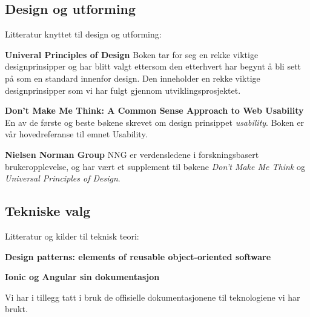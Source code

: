 \subsection{\textbf{Design og utforming}}
Litteratur knyttet til design og utforming:

\begin{description}

    \item \textbf{Univeral Principles of Design}
    Boken tar for seg en rekke viktige designprinsipper og har blitt valgt ettersom den etterhvert har begynt å bli sett på som en standard innenfor design. Den inneholder en rekke viktige designprinsipper som vi har fulgt gjennom utviklingsprosjektet.

    \item \textbf{Don't Make Me Think: A Common Sense Approach to Web Usability}
    En av de første og beste bøkene skrevet om design prinsippet \textit{usability}. Boken er vår hovedreferanse til emnet Usability. 
    
    \item \textbf{Nielsen Norman Group}
    NNG er verdensledene i forskningsbasert brukeropplevelse, og har vært et supplement til bøkene \textit{Don't Make Me Think} og \textit{Universal Principles of Design}.
  

\end{description}





\subsection{\textbf{Tekniske valg}}
Litteratur og kilder til teknisk teori:

\begin{description}
    \item \textbf{Design patterns: elements of reusable object-oriented software}
    
    \item \textbf{Ionic og Angular sin dokumentasjon}
    
    Vi har i tillegg tatt i bruk de offisielle dokumentasjonene til teknologiene vi har brukt. 

\end{description}


